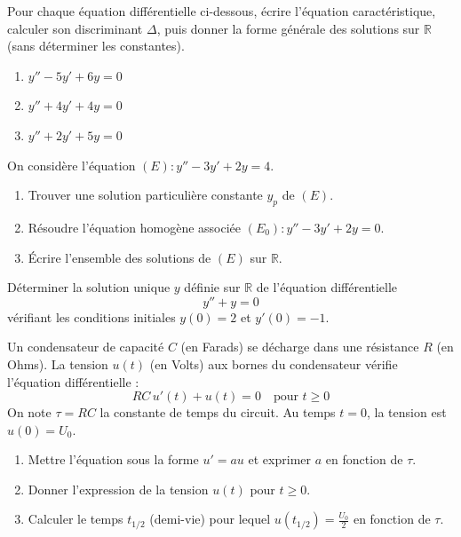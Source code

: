 \documentclass[11pt]{article}
\begin{document}
\begin{exercice}[Équation homogène du second ordre : $ay'' + by' + cy = 0$]
Pour chaque équation différentielle ci-dessous, écrire l'équation caractéristique, calculer son discriminant $\Delta$, puis donner la forme générale des solutions sur $\mathbb{R}$ (sans déterminer les constantes).
\begin{enumerate}
    \item $y'' - 5y' + 6y = 0$
    \item $y'' + 4y' + 4y = 0$
    \item $y'' + 2y' + 5y = 0$
\end{enumerate}
\end{exercice}

\begin{exercice}[Équation non homogène à second membre constant : $ay'' + by' + cy = d$]
On considère l'équation $(E) : y'' - 3y' + 2y = 4$.
\begin{enumerate}
    \item Trouver une solution particulière constante $y_p$ de $(E)$.
    \item Résoudre l'équation homogène associée $(E_0) : y'' - 3y' + 2y = 0$.
    \item Écrire l'ensemble des solutions de $(E)$ sur $\mathbb{R}$.
\end{enumerate}
\end{exercice}

\begin{exercice}
Déterminer la solution unique $y$ définie sur $\mathbb{R}$ de l'équation différentielle
$$y'' + y = 0$$
vérifiant les conditions initiales $y(0) = 2$ et $y'(0) = -1$.
\end{exercice}

\begin{exercice}
Un condensateur de capacité $C$ (en Farads) se décharge dans une résistance $R$ (en Ohms). La tension $u(t)$ (en Volts) aux bornes du condensateur vérifie l'équation différentielle :
$$R C \, u'(t) + u(t) = 0 \quad \text{pour } t \geq 0$$
On note $\tau = RC$ la constante de temps du circuit. Au temps $t=0$, la tension est $u(0) = U_0$.
\begin{enumerate}
    \item Mettre l'équation sous la forme $u' = a u$ et exprimer $a$ en fonction de $\tau$.
    \item Donner l'expression de la tension $u(t)$ pour $t \geq 0$.
    \item Calculer le temps $t_{1/2}$ (demi-vie) pour lequel $u(t_{1/2}) = \frac{U_0}{2}$ en fonction de $\tau$.
\end{enumerate}
\end{exercice}
\end{document}
